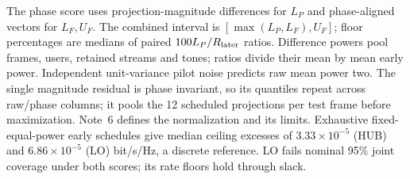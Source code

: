 \begin{table}[htbp]
\begin{tabular}{lllll}
\bottomrule\end{tabular}
\par\medskip\begin{minipage}{\linewidth}\small
The phase score uses projection-magnitude differences for $L_P$ and phase-aligned vectors for $L_F,U_F$. The combined interval is $[\max(L_P,L_F),U_F]$; floor percentages are medians of paired $100L_P/R_{\rm later}$ ratios. Difference powers pool frames, users, retained streams and tones; ratios divide their mean by mean early power. Independent unit-variance pilot noise predicts raw mean power two. The single magnitude residual is phase invariant, so its quantiles repeat across raw/phase columns; it pools the 12 scheduled projections per test frame before maximization. Note~6 defines the normalization and its limits. Exhaustive fixed-equal-power early schedules give median ceiling excesses of $3.33\times10^{-5}$ (HUB) and $6.86\times10^{-5}$ (LO) bit/s/Hz, a discrete reference. LO fails nominal 95\% joint coverage under both scores; its rate floors hold through slack.
\end{minipage}
\end{table}
